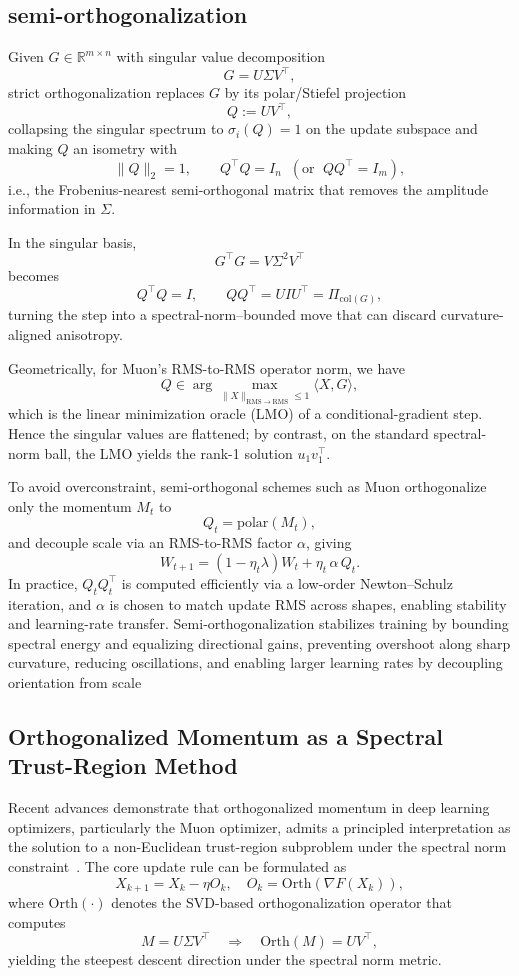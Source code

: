 \documentclass[12pt,a4paper]{article}
\begin{document}
\subsection{semi-orthogonalization}
Given $G \in \mathbb{R}^{m \times n}$ with singular value decomposition
\[
G = U \Sigma V^{\top},
\]
strict orthogonalization replaces $G$ by its polar/Stiefel projection
\[
Q := U V^{\top},
\]
collapsing the singular spectrum to $\sigma_i(Q) = 1$ on the update subspace and making $Q$ an isometry with
\[
\|Q\|_{2} = 1, 
\qquad 
Q^{\top} Q = I_n \; \; (\text{or } \; QQ^{\top} = I_m),
\]
i.e., the Frobenius-nearest semi-orthogonal matrix that removes the amplitude information in $\Sigma$.\parencite{article2}

In the singular basis,
\[
G^{\top} G = V \Sigma^{2} V^{\top}
\]
becomes
\[
Q^{\top} Q = I,
\qquad
QQ^{\top} = U I U^{\top} = \Pi_{\mathrm{col}(G)},
\]
turning the step into a spectral-norm–bounded move that can discard curvature-aligned anisotropy.  

Geometrically, for Muon’s RMS-to-RMS operator norm, we have
\[
Q \in \arg\max_{\|X\|_{\mathrm{RMS}\to\mathrm{RMS}} \leq 1} \langle X, G \rangle,
\]
which is the linear minimization oracle (LMO) of a conditional-gradient step. Hence the singular values are flattened; by contrast, on the standard spectral-norm ball, the LMO yields the rank-1 solution $u_{1} v_{1}^{\top}$.\parencite{lee2021_vonneumann}

To avoid overconstraint, semi-orthogonal schemes such as Muon orthogonalize only the momentum $M_t$ to
\[
Q_t = \mathrm{polar}(M_t),
\]
and decouple scale via an RMS-to-RMS factor $\alpha$, giving
\[
W_{t+1} = (1 - \eta_t \lambda) W_t + \eta_t \, \alpha \, Q_t.
\]
In practice, $Q_t Q_t^{\top}$ is computed efficiently via a low-order Newton–Schulz iteration, and $\alpha$ is chosen to match update RMS across shapes, enabling stability and learning-rate transfer. Semi‑orthogonalization stabilizes training by bounding spectral energy and equalizing directional gains, preventing overshoot along sharp curvature, reducing oscillations, and enabling larger learning rates by decoupling orientation from scale\parencite{liu2025muonscalablellmtraining}

\subsection{Orthogonalized Momentum as a Spectral Trust-Region Method}

Recent advances demonstrate that orthogonalized momentum in deep learning optimizers, particularly the Muon optimizer, admits a principled interpretation as the solution to a non-Euclidean trust-region subproblem under the spectral norm constraint~\parencite{kovalev2025understandinggradientorthogonalizationdeep}. The core update rule can be formulated as
\[
X_{k+1} = X_k - \eta O_k,
\quad 
O_k = \mathrm{Orth}\!\left(\nabla F(X_k)\right),
\]
where $\mathrm{Orth}(\cdot)$ denotes the SVD-based orthogonalization operator that computes
\[
M = U \Sigma V^\top 
\quad \Longrightarrow \quad 
\mathrm{Orth}(M) = U V^\top,
\]
yielding the steepest descent direction under the spectral norm metric.
\end{document}
